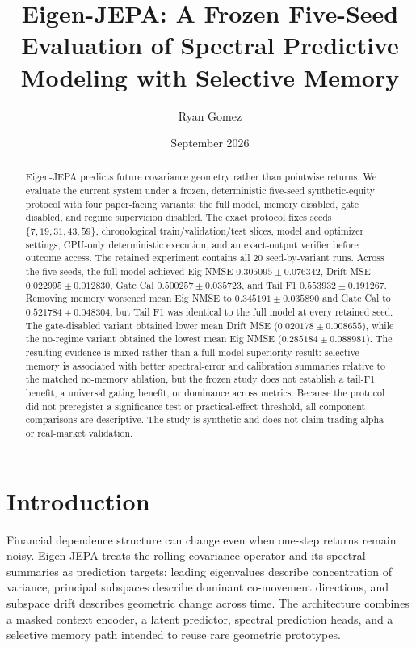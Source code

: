 \documentclass[11pt]{article}
\title{Eigen-JEPA: A Frozen Five-Seed Evaluation of Spectral Predictive Modeling with Selective Memory}
\author{Ryan Gomez}
\date{September 2026}
\begin{document}
\maketitle

\begin{abstract}
Eigen-JEPA predicts future covariance geometry rather than pointwise returns. We evaluate the current system under a frozen, deterministic five-seed synthetic-equity protocol with four paper-facing variants: the full model, memory disabled, gate disabled, and regime supervision disabled. The exact protocol fixes seeds $\{7,19,31,43,59\}$, chronological train/validation/test slices, model and optimizer settings, CPU-only deterministic execution, and an exact-output verifier before outcome access. The retained experiment contains all 20 seed-by-variant runs. Across the five seeds, the full model achieved Eig NMSE $0.305095\pm0.076342$, Drift MSE $0.022995\pm0.012830$, Gate Cal $0.500257\pm0.035723$, and Tail F1 $0.553932\pm0.191267$. Removing memory worsened mean Eig NMSE to $0.345191\pm0.035890$ and Gate Cal to $0.521784\pm0.048304$, but Tail F1 was identical to the full model at every retained seed. The gate-disabled variant obtained lower mean Drift MSE ($0.020178\pm0.008655$), while the no-regime variant obtained the lowest mean Eig NMSE ($0.285184\pm0.088981$). The resulting evidence is mixed rather than a full-model superiority result: selective memory is associated with better spectral-error and calibration summaries relative to the matched no-memory ablation, but the frozen study does not establish a tail-F1 benefit, a universal gating benefit, or dominance across metrics. Because the protocol did not preregister a significance test or practical-effect threshold, all component comparisons are descriptive. The study is synthetic and does not claim trading alpha or real-market validation.
\end{abstract}

\section{Introduction}
Financial dependence structure can change even when one-step returns remain noisy. Eigen-JEPA treats the rolling covariance operator and its spectral summaries as prediction targets: leading eigenvalues describe concentration of variance, principal subspaces describe dominant co-movement directions, and subspace drift describes geometric change across time. The architecture combines a masked context encoder, a latent predictor, spectral prediction heads, and a selective memory path intended to reuse rare geometric prototypes.
\end{document}
